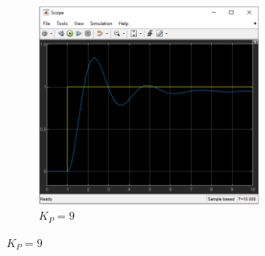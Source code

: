 \documentclass{article}
\begin{document}
\begin{figure}[h]
\begin{subfigure}{0.5\textwidth}
				\label{fig:subim1}
			\end{subfigure}
			\begin{subfigure}{0.5\textwidth}
				\includegraphics[width=1\linewidth, height=6.5cm]{2_3c/9.png}
				\caption{$K_P = 9$}
				\label{fig:subim2}
			\end{subfigure}
			\label{fig:image2}
		\end{figure}
\newpage
\end{document}
